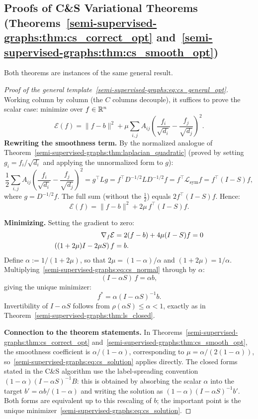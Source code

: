 \begin{notechapter}
\subsection{Proofs of C\&S Variational Theorems
  (Theorems~\ref{semi-supervised-graphs:thm:cs_correct_opt} and~\ref{semi-supervised-graphs:thm:cs_smooth_opt})}
\label{semi-supervised-graphs:app:cs_opt}

Both theorems are instances of the same general result.

\begin{proof}[Proof of the general template~\eqref{semi-supervised-graphs:eq:cs_general_opt}]
Working column by column (the $C$ columns decouple), it suffices to prove the
scalar case: minimize over $f \in \mathbb{R}^n$
\[
  \mathcal{E}(f) = \|f - b\|^2 + \mu\sum_{i,j}A_{ij}
  \left(\frac{f_i}{\sqrt{d_i}} - \frac{f_j}{\sqrt{d_j}}\right)^2.
\]
\textbf{Rewriting the smoothness term.}
By the normalized analogue of Theorem~\ref{semi-supervised-graphs:thm:laplacian_quadratic} (proved by
setting $g_i = f_i/\sqrt{d_i}$ and applying the unnormalized form to $g$):
\[
\frac{1}{2}\sum_{i,j}A_{ij}\left(\frac{f_i}{\sqrt{d_i}} -
\frac{f_j}{\sqrt{d_j}}\right)^2
= g^\top L g = f^\top D^{-1/2}LD^{-1/2}f = f^\top\mathcal{L}_{\mathrm{sym}}f
= f^\top(I-S)f,
\]
where $g = D^{-1/2}f$. The full sum (without the $\frac{1}{2}$) equals
$2f^\top(I-S)f$. Hence:
\[
\mathcal{E}(f) = \|f - b\|^2 + 2\mu\, f^\top(I-S)f.
\]

\textbf{Minimizing.} Setting the gradient to zero:
\begin{align}
\nabla_f\mathcal{E} &= 2(f - b) + 4\mu(I - S)f = 0 \notag\\
((1+2\mu)I - 2\mu S)\,f &= b. \label{semi-supervised-graphs:eq:cs_normal}
\end{align}
Define $\alpha := 1/(1+2\mu)$, so that $2\mu = (1-\alpha)/\alpha$ and
$(1+2\mu) = 1/\alpha$. Multiplying~\eqref{semi-supervised-graphs:eq:cs_normal} through by $\alpha$:
\[
(I - \alpha S)\,f = \alpha b,
\]
giving the unique minimizer:
\begin{equation}
\label{semi-supervised-graphs:eq:cs_solution}
f^* = \alpha(I - \alpha S)^{-1}b.
\end{equation}
Invertibility of $I - \alpha S$ follows from $\rho(\alpha S) \leq \alpha < 1$,
exactly as in Theorem~\ref{semi-supervised-graphs:thm:ls_closed}.

\textbf{Connection to the theorem statements.}
In Theorems~\ref{semi-supervised-graphs:thm:cs_correct_opt} and~\ref{semi-supervised-graphs:thm:cs_smooth_opt}, the
smoothness coefficient is $\alpha/(1-\alpha)$, corresponding to
$\mu = \alpha/(2(1-\alpha))$, so~\eqref{semi-supervised-graphs:eq:cs_solution} applies directly.
The closed forms stated in the C\&S algorithm use the label-spreading
convention $(1-\alpha)(I-\alpha S)^{-1}B$: this is obtained by absorbing the
scalar $\alpha$ into the target $b' = \alpha b/(1-\alpha)$ and writing the
solution as $(1-\alpha)(I-\alpha S)^{-1}b'$. Both forms are equivalent up to
this rescaling of $b$; the important point is the unique minimizer~\eqref{semi-supervised-graphs:eq:cs_solution}.


\end{proof}
\end{notechapter}
